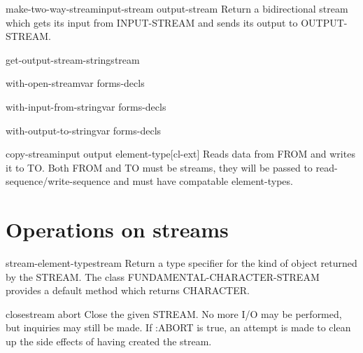 \documentclass[10pt,english]{book}
\begin{document}
\begin{function}{make-two-way-stream}{input-stream output-stream}
  Return a bidirectional stream which gets its input from INPUT-STREAM and
   sends its output to OUTPUT-STREAM.
\end{function}

\begin{function}{get-output-stream-string}{stream}
  
\end{function}

\begin{macro}{with-open-stream}{var \body forms-decls}
  
\end{macro}

\begin{macro}{with-input-from-string}{var \body forms-decls}
  
\end{macro}

\begin{macro}{with-output-to-string}{var \body forms-decls}
  
\end{macro}

\begin{function}{copy-stream}{input output \op element-type}[cl-ext]
  Reads data from FROM and writes it to TO. Both FROM and TO must be streams,
they will be passed to read-sequence/write-sequence and must have compatable
element-types.
\end{function}

\section{Operations on streams}
\label{sec:operations-streams}

\begin{function}{stream-element-type}{stream}
  Return a type specifier for the kind of object returned by the
  STREAM. The class FUNDAMENTAL-CHARACTER-STREAM provides a default method
  which returns CHARACTER.
\end{function}

\begin{function}{close}{stream \key abort}
  Close the given STREAM. No more I/O may be performed, but
  inquiries may still be made. If :ABORT is true, an attempt is made
  to clean up the side effects of having created the stream.
\end{function}
\end{document}
